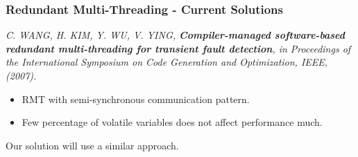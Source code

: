 \documentclass[xcolor=pdftex,dvipsnames,table]{beamer}
\begin{document}
\begin{frame}
	\frametitle{Redundant Multi-Threading - Current Solutions}
        
   \emph{C. WANG, H. KIM, Y. WU,  V. YING, \textbf{Compiler-managed software-based redundant multi-threading for transient fault detection}, in Proceedings of the International Symposium on Code Generation and Optimization, IEEE, (2007).}
              
	\vskip 0.2in 
              
	\begin{itemize}
    	\item RMT with semi-synchronous communication pattern. 
        \item Few percentage of volatile variables does not affect performance much. 
    \end{itemize}
    
   	\begin{shaded}
    	\centerline{Our solution will use a similar approach.} 
    \end{shaded}
     
\end{frame}
   
\end{document}
